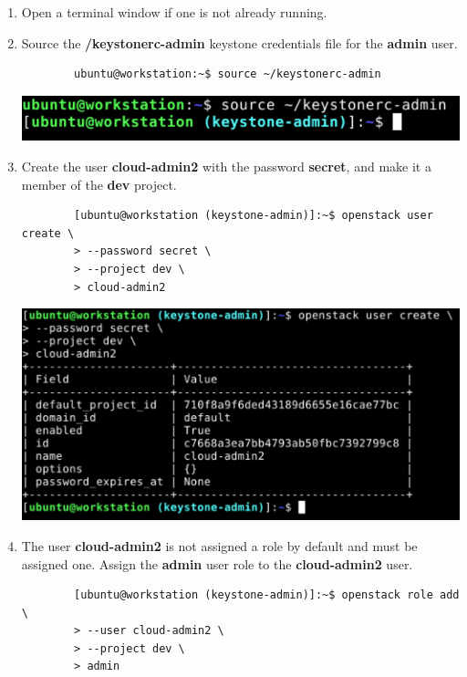 \documentclass[letterpaper, 12pt]{article}
\begin{document}
\begin{enumerate}
    \item Open a terminal window if one is not already running.
    
    \item Source the \textbf{\texttildemid/keystonerc-admin} keystone credentials file for the \textbf{admin} user.
    \begin{lstlisting}
        ubuntu@workstation:~$ source ~/keystonerc-admin
    \end{lstlisting}

    \begin{center}
        \includegraphics[width=\linewidth]{images/part6/step2.png}
    \end{center}

    \item Create the user \textbf{cloud-admin2} with the password \textbf{secret}, and make it a member of the
    \textbf{dev} project.
    \begin{lstlisting}
        [ubuntu@workstation (keystone-admin)]:~$ openstack user create \
        > --password secret \
        > --project dev \
        > cloud-admin2
    \end{lstlisting}

    \begin{center}
        \includegraphics[width=\linewidth]{images/part6/step3.png}
    \end{center}

    \item The user \textbf{cloud-admin2} is not assigned a role by default and must be assigned one. Assign the
    \textbf{admin} user role to the \textbf{cloud-admin2} user.
    \begin{lstlisting}
        [ubuntu@workstation (keystone-admin)]:~$ openstack role add \
        > --user cloud-admin2 \
        > --project dev \
        > admin
    \end{lstlisting}


\end{enumerate}
\end{document}
